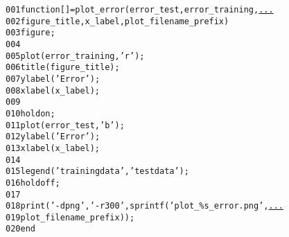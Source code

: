 \begin{alltt}
\textcolor{linenr}{001  }\textcolor{keyword}{function} [] = plot\_error(error\_test, error\_training, \textcolor{keyword}{\underline{...}}
\textcolor{linenr}{002  }    figure\_title, x\_label, plot\_filename\_prefix)
\textcolor{linenr}{003  }    figure;
\textcolor{linenr}{004  }     
\textcolor{linenr}{005  }    plot(error\_training, \textcolor{string}{'r'});
\textcolor{linenr}{006  }    title(figure\_title);
\textcolor{linenr}{007  }    ylabel(\textcolor{string}{'Error'});
\textcolor{linenr}{008  }    xlabel(x\_label);
\textcolor{linenr}{009  }  
\textcolor{linenr}{010  }    hold on; 
\textcolor{linenr}{011  }    plot(error\_test, \textcolor{string}{'b'});
\textcolor{linenr}{012  }    ylabel(\textcolor{string}{'Error'});
\textcolor{linenr}{013  }    xlabel(x\_label);
\textcolor{linenr}{014  }  
\textcolor{linenr}{015  }    legend(\textcolor{string}{'training data'}, \textcolor{string}{'test data'});
\textcolor{linenr}{016  }    hold off;
\textcolor{linenr}{017  }  
\textcolor{linenr}{018  }    print(\textcolor{string}{'-dpng'}, \textcolor{string}{'-r300'}, sprintf(\textcolor{string}{'plot\_\%s\_error.png'}, \textcolor{keyword}{\underline{...}}
\textcolor{linenr}{019  }        plot\_filename\_prefix));
\textcolor{linenr}{020  }\textcolor{keyword}{end}
\end{alltt}
